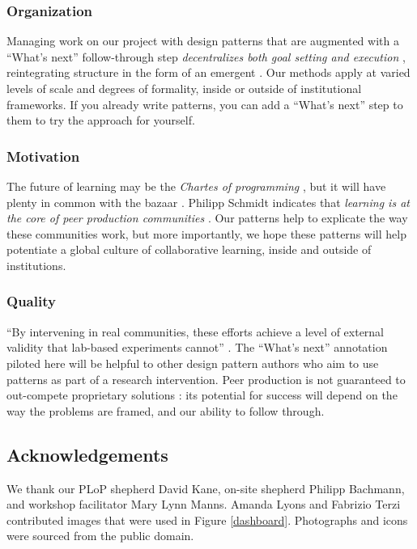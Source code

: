 \vspace{-.25\baselineskip}

\subsubsection*{Organization} 
Managing work on our project with design patterns that are augmented
with a ``What's next'' follow-through step \emph{decentralizes both
  goal setting and execution} \cite{benkler2015peer}, reintegrating
structure in the form of an emergent .  Our
methods apply at varied levels of scale and degrees of formality,
inside or outside of institutional frameworks.  If you already write
patterns, you can add a ``What's next'' step to them to try the
approach for yourself.

\vspace{-.25\baselineskip}

\subsubsection*{Motivation}  The future of learning may be
the \emph{Chartes of programming} \cite{alexander1999origins}, but it will have plenty in common with the
bazaar \cite{raymond2001cathedral}.
%
Philipp Schmidt indicates that \emph{learning is at the core of peer
  production communities} \cite{schmidt+commons-based+2009}.  Our
patterns help to explicate the way these communities work, but more
importantly, we hope these patterns will help potentiate a global
culture of collaborative learning, inside and outside of institutions.

\vspace{-.25\baselineskip}

\subsubsection*{Quality} 
``By intervening in real communities, these efforts achieve a level of
external validity that lab-based experiments cannot''
\cite{benkler2015peer}.  The ``What's next'' annotation piloted here
will be helpful to other design pattern authors who aim to use
patterns as part of a research intervention.  Peer production is not guaranteed to
  out-compete proprietary solutions
\cite{benkler2015peer,free-software-better}: its potential for
success will depend on the way the problems are framed,
and our ability to follow through.

\subsection*{Acknowledgements}
We thank our PLoP shepherd David Kane, on-site shepherd Philipp
Bachmann, and workshop facilitator Mary Lynn Manns.  Amanda Lyons and
Fabrizio Terzi contributed images that were used in Figure
\ref{dashboard}.  Photographs and icons were sourced from the public
domain.


